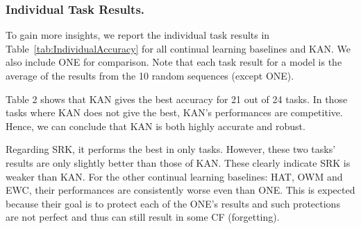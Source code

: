 \documentclass[runningheads]{llncs}
\begin{document}
\subsubsection{Individual Task Results.} 
To gain more insights, we report the individual task results in Table~\ref{tab:IndividualAccuracy} for all continual learning baselines and KAN. We also include ONE for comparison. Note that each task result for a model is the average of the results from the 10 random sequences (except ONE). 

Table 2 shows that KAN gives the best accuracy for 21 out of 24 tasks. In those tasks where KAN does not give the best, KAN's performances are competitive.  Hence, we can conclude that KAN is both highly accurate and robust. 

Regarding SRK, it performs the best in only  tasks. However, these two tasks' results are only slightly better than those of KAN. These clearly indicate SRK is weaker than KAN. For the other continual learning baselines: HAT, OWM and EWC, their performances are consistently worse even than ONE. This is expected because their goal is to protect each of the ONE's results and such protections are not perfect and thus can still result in some CF (forgetting). 

\begin{table*}[t!]
\centering
{}
\caption{Effects of forward and backward knowledge transfer of KAN.
We give progressive results after 6, 12, 18, and 24 tasks have been learned respectively.
}
\label{tab:KnowledgeTransfer}
\end{table*}
\end{document}
